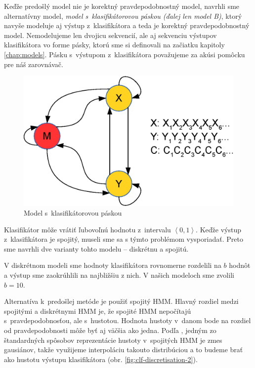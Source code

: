 

Keďže predošlý model nie je korektný pravdepodobnostný model, navrhli sme alternatívny model, \textit{model s~klasifikátorovou páskou (ďalej len model B)}, ktorý navyše modeluje aj výstup z~klasifikátora a teda je korektný pravdepodobnostný model.
Nemodelujeme len dvojicu sekvencií, ale aj sekvenciu výstupov klasifikátora vo forme pásky, ktorú sme si definovali na začiatku kapitoly \ref{chap:models}.
Pásku s~výstupom z~klasifikátora považujeme za akúsi pomôcku pre náš zarovnávač.
\begin{figure}[htp]
    \centering
    \includegraphics[width=.5\textwidth]{images/model_clf_paska}
    \caption{Model s~klasifikátorovou páskou}
\end{figure}
Klasifikátor môže vrátiť ľubovoľnú hodnotu z~intervalu $\left<0,1 \right>$. Keďže výstup z~klasifikátora je spojitý, museli sme sa s týmto problémom vysporiadať. Preto sme navrhli dve varianty tohto modelu -- diskrétnu a spojitú.

V diskrétnom modeli sme hodnoty klasifikátora rovnomerne rozdelili na $b$ hodnôt a výstup sme zaokrúhlili na najbližšiu z nich. V našich modeloch sme zvolili $b=10$.

Alternatíva k~predošlej metóde je použiť spojitý HMM. Hlavný rozdiel medzi spojitými a diskrétnymi HMM je, že spojité HMM nepočítajú s~pravdepodobnosťou, ale s~hustotou. Hodnota hustoty v~danom bode na rozdiel od pravdepodobnosti môže byť aj väčšia ako jedna. Podľa  \cite{huang1989multiple}, jedným zo štandardných spôsobov reprezentácie hustoty v~spojitých HMM je zmes gausiánov, takže využijeme interpoláciu takouto distribúciou a to budeme brať ako hustotu výstupu klasifikátora (obr. \ref{fig:clf-discretisation-2}).

